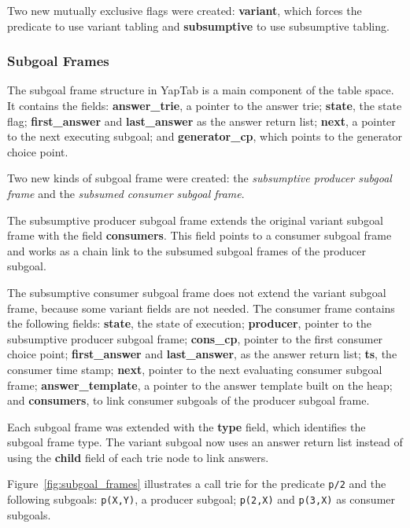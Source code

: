 Two new mutually exclusive flags were created: \textbf{variant}, which forces the predicate to use variant
tabling and \textbf{subsumptive} to use subsumptive tabling.

\subsubsection{Subgoal Frames}

The subgoal frame structure in YapTab is a main component of the table space.
It contains the fields: \textbf{answer\_trie}, a pointer to the answer trie;
\textbf{state}, the state flag; \textbf{first\_answer} and \textbf{last\_answer}
as the answer return list; \textbf{next}, a pointer to the next executing subgoal;
and \textbf{generator\_cp}, which points to the generator choice point.

Two new kinds of subgoal frame were created: the \textit{subsumptive producer subgoal frame} and
the \textit{subsumed consumer subgoal frame}.

The subsumptive producer subgoal frame extends the original variant subgoal frame
with the field \textbf{consumers}. This field points to a consumer subgoal frame and works
as a chain link to the subsumed subgoal frames of the producer subgoal.

The subsumptive consumer subgoal frame does not extend the variant subgoal frame, because
some variant fields are not needed.
The consumer frame contains the following fields: \textbf{state}, the state of execution;
\textbf{producer}, pointer to the subsumptive producer subgoal frame; \textbf{cons\_cp},
pointer to the first consumer choice point; \textbf{first\_answer} and \textbf{last\_answer},
as the answer return list; \textbf{ts}, the consumer time stamp;
\textbf{next}, pointer to the next evaluating consumer subgoal frame; \textbf{answer\_template},
a pointer to the answer template built on the heap; and \textbf{consumers},
to link consumer subgoals of the producer subgoal frame.

Each subgoal frame was extended with the \textbf{type} field, which identifies the subgoal frame type.
The variant subgoal now uses an answer return list instead of using the \textbf{child} field of
each trie node to link answers.

Figure~\ref{fig:subgoal_frames} illustrates a call trie for the predicate \texttt{p/2}
and the following subgoals: \texttt{p(X,Y)}, a producer subgoal; \texttt{p(2,X)} and
\texttt{p(3,X)} as consumer subgoals.

